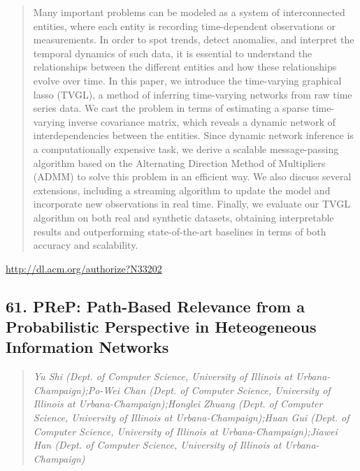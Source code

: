 \documentclass{article}
\begin{document}
\begin{quote}
Many important problems can be modeled as a system of interconnected entities, where each entity is recording time-dependent observations or measurements. In order to spot trends, detect anomalies, and interpret the temporal dynamics of such data, it is essential to understand the relationships between the different entities and how these relationships evolve over time. In this paper, we introduce the time-varying graphical lasso (TVGL), a method of inferring time-varying networks from raw time series data. We cast the problem in terms of estimating a sparse time-varying inverse covariance matrix, which reveals a dynamic network of interdependencies between the entities. Since dynamic network inference is a computationally expensive task, we derive a scalable message-passing algorithm based on the Alternating Direction Method of Multipliers (ADMM) to solve this problem in an efficient way. We also discuss several extensions, including a streaming algorithm to update the model and incorporate new observations in real time. Finally, we evaluate our TVGL algorithm on both real and synthetic datasets, obtaining interpretable results and outperforming state-of-the-art baselines in terms of both accuracy and scalability.
\end{quote}

\href{http://dl.acm.org/authorize?N33202}{http://dl.acm.org/authorize?N33202}

\subsection{61. PReP: Path-Based Relevance from a Probabilistic Perspective in Heteogeneous Information Networks}

\begin{quote}
\footnotesize{\textit{Yu Shi (Dept. of Computer Science, University of Illinois at Urbana-Champaign);Po-Wei Chan (Dept. of Computer Science, University of Illinois at Urbana-Champaign);Honglei Zhuang (Dept. of Computer Science, University of Illinois at Urbana-Champaign);Huan Gui (Dept. of Computer Science, University of Illinois at Urbana-Champaign);Jiawei Han (Dept. of Computer Science, University of Illinois at Urbana-Champaign)}}

\end{quote}
\end{document}
